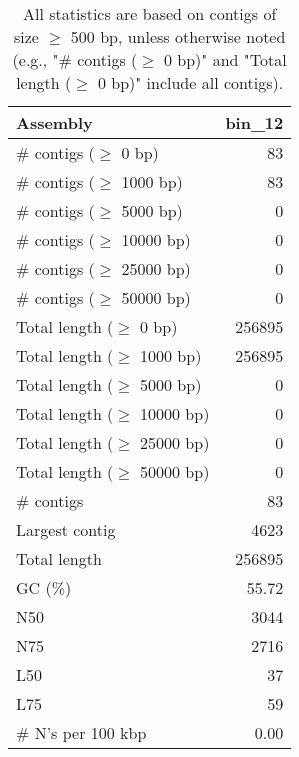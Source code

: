 \documentclass[12pt,a4paper]{article}
\begin{document}
\begin{table}[ht]
\begin{center}
\caption{All statistics are based on contigs of size $\geq$ 500 bp, unless otherwise noted (e.g., "\# contigs ($\geq$ 0 bp)" and "Total length ($\geq$ 0 bp)" include all contigs).}
\begin{tabular}{|l*{1}{|r}|}
\hline
Assembly & bin\_12 \\ \hline
\# contigs ($\geq$ 0 bp) & 83 \\ \hline
\# contigs ($\geq$ 1000 bp) & 83 \\ \hline
\# contigs ($\geq$ 5000 bp) & 0 \\ \hline
\# contigs ($\geq$ 10000 bp) & 0 \\ \hline
\# contigs ($\geq$ 25000 bp) & 0 \\ \hline
\# contigs ($\geq$ 50000 bp) & 0 \\ \hline
Total length ($\geq$ 0 bp) & 256895 \\ \hline
Total length ($\geq$ 1000 bp) & 256895 \\ \hline
Total length ($\geq$ 5000 bp) & 0 \\ \hline
Total length ($\geq$ 10000 bp) & 0 \\ \hline
Total length ($\geq$ 25000 bp) & 0 \\ \hline
Total length ($\geq$ 50000 bp) & 0 \\ \hline
\# contigs & 83 \\ \hline
Largest contig & 4623 \\ \hline
Total length & 256895 \\ \hline
GC (\%) & 55.72 \\ \hline
N50 & 3044 \\ \hline
N75 & 2716 \\ \hline
L50 & 37 \\ \hline
L75 & 59 \\ \hline
\# N's per 100 kbp & 0.00 \\ \hline
\end{tabular}
\end{center}
\end{table}
\end{document}
